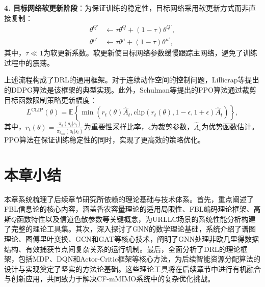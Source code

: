 \textbf{4. 目标网络软更新阶段}：为保证训练的稳定性，目标网络采用软更新方式而非直接复制：
\begin{align}
\theta^{Q'} &\leftarrow \tau\theta^Q + (1-\tau)\theta^{Q'}, \\
\theta^{\mu'} &\leftarrow \tau\theta^{\mu} + (1-\tau)\theta^{\mu'},
\end{align}
其中，$\tau \ll 1$为软更新系数。软更新使目标网络参数缓慢跟踪主网络，避免了训练过程中的震荡。

上述流程构成了DRL的通用框架。对于连续动作空间的控制问题，Lillicrap等\cite{chaptertwo15}提出的DDPG算法是该框架的典型实现。此外，Schulman等\cite{chaptertwo14}提出的PPO算法通过裁剪目标函数限制策略更新幅度：
\begin{equation}
L^{\text{CLIP}}(\theta) = \mathbb{E}\left\{\min\left(r_t(\theta)\hat{A}_t, \text{clip}(r_t(\theta), 1-\epsilon, 1+\epsilon)\hat{A}_t\right)\right\},
\end{equation}
其中，$r_t(\theta) = \frac{\pi_{\theta}(a_t|s_t)}{\pi_{\theta_{\text{old}}}(a_t|s_t)}$为重要性采样比率，$\epsilon$为裁剪参数，$\hat{A}_t$为优势函数估计。PPO算法在保证训练稳定性的同时，实现了更高效的策略优化。

\section{本章小结}

本章系统梳理了后续章节研究所依赖的理论基础与技术体系。首先，重点阐述了FBL信息论\textcite{chaptertwo1}的核心内容，涵盖香农容量理论的适用局限性、FBL编码理论框架、高斯$Q$函数特性以及信道色散参数等关键概念，为URLLC场景的系统性能分析构建了完整的理论工具集。其次，深入探讨了GNN的数学理论基础，系统介绍了谱图理论、图傅里叶变换、GCN和GAT等核心技术，阐明了GNN处理非欧几里得数据结构、有效捕获节点间复杂关系的运行机制。最后，全面分析了DRL的理论框架，包括MDP、DQN和Actor-Critic框架等核心方法，为后续智能资源分配算法的设计与实现奠定了坚实的方法论基础。这些理论工具将在后续章节中进行有机融合与创新应用，共同致力于解决CF-mMIMO系统中的复杂优化挑战。
